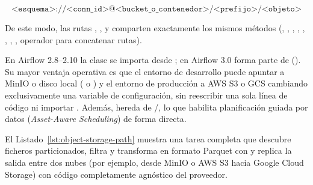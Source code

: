 \[
\texttt{<esquema>://<conn\_id>@<bucket\_o\_contenedor>/<prefijo>/<objeto>}
\]

De este modo, las rutas , ,  y  comparten exactamente los mismos métodos (, , , , , , , , operador \code{/} para concatenar rutas).

\begin{modernbox}
En Airflow 2.8--2.10 la clase se importa desde ; en Airflow 3.0 forma parte de  (). Su mayor ventaja operativa es que el entorno de desarrollo puede apuntar a MinIO o disco local ( o ) y el entorno de producción a AWS S3 o GCS cambiando exclusivamente una variable de configuración, sin reescribir una sola línea de código ni importar . Además,  hereda de /, lo que habilita planificación guiada por datos (\textit{Asset-Aware Scheduling}) de forma directa.
\end{modernbox}

El Listado~\ref{lst:object-storage-path} muestra una tarea completa que descubre ficheros particionados, filtra y transforma en formato Parquet con  y replica la salida entre dos nubes (por ejemplo, desde MinIO o AWS S3 hacia Google Cloud Storage) con código completamente agnóstico del proveedor.

